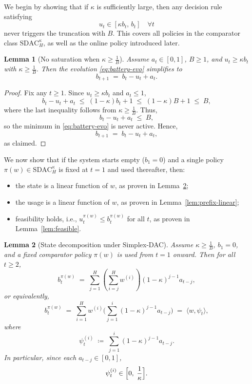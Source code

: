 \documentclass[11pt]{article}
\newtheorem{Thm:Lemma}{Lemma}
\begin{document}
We begin by showing that if \(\kappa\) is sufficiently large, then any decision rule satisfying
\[
u_t \in [\kappa b_t,\, b_t] \quad \forall t
\]
never triggers the truncation with \(B\).  
This covers all policies in the comparator class \(\mathrm{SDAC}_H^\kappa\), as well as the online policy introduced later.

\begin{Thm:Lemma}[No saturation when \(\kappa \geq \tfrac{1}{B}\)]
\label{lem:no-sat}
Assume \(a_t \in [0,1]\), \(B \ge 1\), and \(u_t \ge \kappa b_t\) with \(\kappa \geq \tfrac{1}{B}\).  
Then the evolution \eqref{eq:battery-evo} simplifies to
\[
b_{t+1} \;=\; b_t - u_t + a_t.
\]
\end{Thm:Lemma}

\begin{proof}
Fix any \(t \ge 1\). Since \(u_t \ge \kappa b_t\) and \(a_t \le 1\),
\[
b_t - u_t + a_t
\;\le\; (1-\kappa)b_t + 1
\;\le\; (1-\kappa)B + 1
\;\le\; B,
\]
where the last inequality follows from \(\kappa \ge \tfrac{1}{B}\).  
Thus,
\[
b_t - u_t + a_t \;\le\; B,
\]
so the minimum in \eqref{eq:battery-evo} is never active. Hence,
\[
b_{t+1} \;=\; b_t - u_t + a_t,
\]
as claimed.
\end{proof}




We now show that if the system starts empty (\(b_1=0\)) and a single policy \(\pi(w)\in\mathrm{SDAC}_H^\kappa\) is fixed at \(t=1\) and used thereafter, then:
\begin{itemize}
    \item the state is a linear function of \(w\), as proven in Lemma~\ref{lem:state-decomp};
    \item the usage is a linear function of \(w\), as proven in Lemma~\ref{lem:prefix-linear};
    \item feasibility holds, i.e., \(u_t^{\pi(w)} \le b_t^{\pi(w)}\) for all \(t\), as proven in Lemma~\ref{lem:feasible}.
\end{itemize}


\begin{Thm:Lemma}[State decomposition under Simplex-DAC]
\label{lem:state-decomp}
Assume \(\kappa \ge \tfrac{1}{B}\), \(b_1=0\), and a fixed comparator policy \(\pi(w)\) is used from \(t=1\) onward. Then for all \(t \ge 2\),
\[
b_t^{\pi(w)}
\;=\;
\sum_{j=1}^{H} \left(\sum_{i=j}^H w^{(i)}\right) (1-\kappa)^{j-1} a_{t-j},
\]
or equivalently,
\[
b_t^{\pi(w)}
\;=\;
\sum_{i=1}^H w^{(i)} \Biggl(\sum_{j=1}^{i} (1-\kappa)^{j-1} a_{t-j}\Biggr)
\;=\;
\langle w , \psi_t\rangle ,
\]
where
\[
\psi_t^{(i)}
\;\coloneqq\;
\sum_{j=1}^{i} (1-\kappa)^{j-1} a_{t-j}.
\]
In particular, since each \(a_{t-j}\in[0,1]\),
\[
\psi_t^{(i)} \in \Bigl[0,\;\frac{1}{\kappa}\Bigr].
\]
\end{Thm:Lemma}
\end{document}

